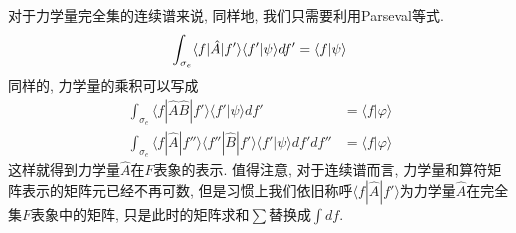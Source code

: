 \documentclass[a4paper,11pt]{book}
\newcommand{\A}{\hat{A}}
\newcommand{\B}{\hat{B}}
\begin{document}
对于力学量完全集的连续谱来说, 同样地, 我们只需要利用Parseval等式.
\begin{equation*}
\int_{\sigma_e}\langle f|\A|f'\rangle\langle f'|\psi\rangle df' =\langle f|\psi\rangle \\
\end{equation*}
同样的, 力学量的乘积可以写成
\begin{equation*}
  \begin{split}
     \int_{\sigma_e}\langle f|\A\B|f'\rangle\langle f'|\psi\rangle df' & =\langle f|\varphi\rangle \\
     \int_{\sigma_e}\langle f|\A|f''\rangle\langle f''|\B|f'\rangle\langle f'|\psi\rangle df'df'' & =\langle f|\varphi\rangle
  \end{split}
\end{equation*}
这样就得到力学量$\A$在$F$表象的表示. 值得注意, 对于连续谱而言, 力学量和算符矩阵表示的矩阵元已经不再可数, 但是习惯上我们依旧称呼$\langle f|\A|f'\rangle$为力学量$\A$在完全集$F$表象中的矩阵, 只是此时的矩阵求和$\sum$替换成$\int df$.
\end{document}

